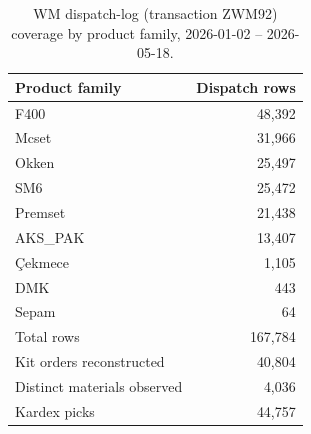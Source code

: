 \begin{table}[htbp]
\centering
\caption{WM dispatch-log (transaction ZWM92) coverage by product family,
2026-01-02 -- 2026-05-18.}
\label{tab:zwm92}
\begin{tabular}{lr}
\toprule
Product family & Dispatch rows \\
\midrule
F400 & 48,392 \\
Mcset & 31,966 \\
Okken & 25,497 \\
SM6 & 25,472 \\
Premset & 21,438 \\
AKS\_PAK & 13,407 \\
Çekmece & 1,105 \\
DMK & 443 \\
Sepam & 64 \\
\midrule
Total rows & 167,784 \\
Kit orders reconstructed & 40,804 \\
Distinct materials observed & 4,036 \\
Kardex picks & 44,757 \\
\bottomrule
\end{tabular}
\end{table}
